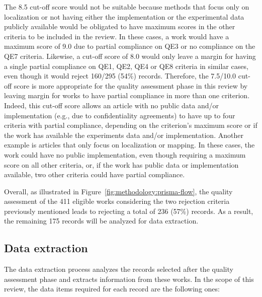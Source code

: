 \documentclass[10pt,a4paper,notitlepage,twocolumn,oneside]{article}
\begin{document}
The 8.5 cut-off score would not be suitable because methods that focus only on localization or not having either the implementation or the experimental data publicly available would be obligated to have maximum scores in the other criteria to be included in the review. In these cases, a work would have a maximum score of 9.0 due to partial compliance on QE3 or no compliance on the QE7 criteria. Likewise, a cut-off score of 8.0 would only leave a margin for having a single partial compliance on QE1, QE2, QE4 or QE8 criteria in similar cases, even though it would reject 160/295 (54\%) records. Therefore, the 7.5/10.0 cut-off score is more appropriate for the quality assessment phase in this review by leaving margin for works to have partial compliance in more than one criterion. Indeed, this cut-off score allows an article with no public data and/or implementation (e.g., due to confidentiality agreements) to have up to four criteria with partial compliance, depending on the criterion's maximum score or if the work has available the experiments data and/or implementation. Another example is articles that only focus on localization or mapping. In these cases, the work could have no public implementation, even though requiring a maximum score on all other criteria, or, if the work has public data or implementation available, two other criteria could have partial compliance.

Overall, as illustrated in Figure~\ref{fig:methodology:prisma-flow}, the quality assessment of the 411 eligible works considering the two rejection criteria previously mentioned leads to rejecting a total of 236 (57\%) records. As a result, the remaining 175 records will be analyzed for data extraction.

\subsection{Data extraction}
\label{sec:methodology:data}

The data extraction process analyzes the records selected after the quality assessment phase and extracts information from these works. In the scope of this review, the data items required for each record are the following ones:
\end{document}
